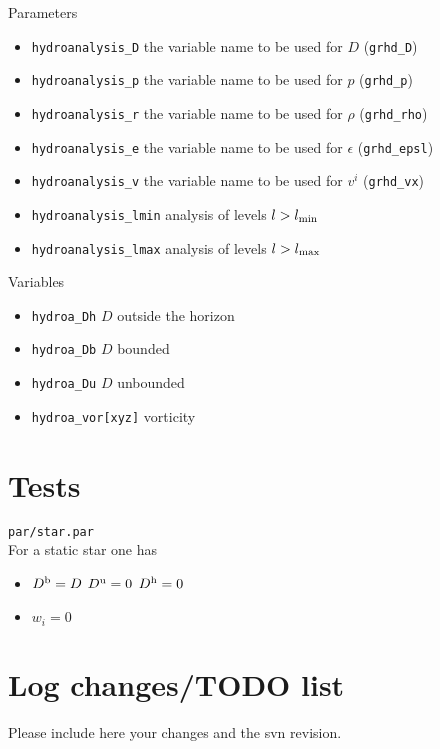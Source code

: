 \documentclass[a4paper,10pt]{article}
\begin{document}
Parameters
\begin{itemize}
\item \verb#hydroanalysis_D# the variable name to be used for $D$ (\verb#grhd_D#)
\item \verb#hydroanalysis_p# the variable name to be used for $p$ (\verb#grhd_p#)
\item \verb#hydroanalysis_r# the variable name to be used for $\rho$ (\verb#grhd_rho#)
\item \verb#hydroanalysis_e# the variable name to be used for $\epsilon$ (\verb#grhd_epsl#)
\item \verb#hydroanalysis_v# the variable name to be used for $v^i$ (\verb#grhd_vx#)
\item \verb#hydroanalysis_lmin# analysis of levels $l>l_{\rm min}$
\item \verb#hydroanalysis_lmax# analysis of levels $l>l_{\rm max}$
\end{itemize}
Variables
\begin{itemize}
\item \verb#hydroa_Dh# $D$ outside the horizon
\item \verb#hydroa_Db# $D$ bounded 
\item \verb#hydroa_Du# $D$ unbounded 
\item \verb#hydroa_vor[xyz]# vorticity
\end{itemize}

\section{Tests}
\label{sec:tests} 

\verb#par/star.par#\\
For a static star one has
\begin{itemize}
\item $D^{\rm b} = D$ $D^{\rm u} = 0$ $D^{\rm h} = 0$ 
\item $w_i=0$
\end{itemize}


\section{Log changes/TODO list}
\label{sec:log} 

Please include here your changes and the svn revision.
\end{document}
